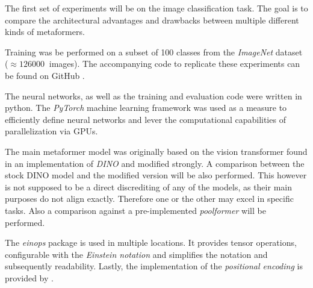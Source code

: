 The first set of experiments will be on the image classification task.
The goal is to compare the architectural advantages and drawbacks between multiple different kinds of metaformers.

Training was be performed on a subset of 100 classes from the \emph{ImageNet} dataset \cite{imagenetDataset} ($\approx \SI{126000}{}$ images).
The accompanying code to replicate these experiments can be found on GitHub \cite{selfComputerScience}.

The neural networks, as well as the training and evaluation code were written in python.
The \emph{PyTorch} \cite{pytorchGithub} machine learning framework was used as a measure to efficiently define neural networks and lever the computational capabilities of parallelization via GPUs.

The main metaformer model was originally based on the vision transformer found in an implementation of \emph{DINO} \cite{dinoGithub} and modified strongly.  
A comparison between the stock DINO model and the modified version will be also performed.
This however is not supposed to be a direct discrediting of any of the models, as their main purposes do not align exactly.
Therefore one or the other may excel in specific tasks.
Also a comparison against a pre-implemented \emph{poolformer} \cite{poolformerGithub} will be performed.

The \emph{einops} package \cite{einopsGithub} is used in multiple locations.
It provides tensor operations, configurable with the \emph{Einstein notation} and simplifies the notation and subsequently readability.
Lastly, the implementation of the \emph{positional encoding} is provided by \cite{positionalEncodingGithub}.
